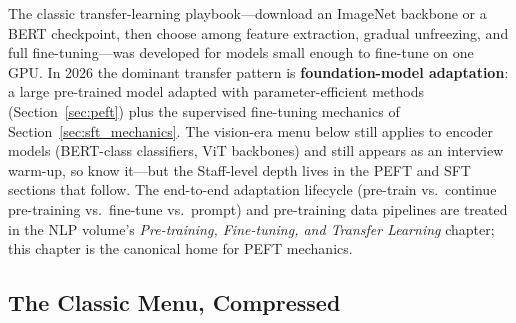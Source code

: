 The classic transfer-learning playbook---download an ImageNet backbone or a BERT checkpoint, then choose among feature extraction, gradual unfreezing, and full fine-tuning---was developed for models small enough to fine-tune on one GPU. In 2026 the dominant transfer pattern is \textbf{foundation-model adaptation}: a large pre-trained model adapted with parameter-efficient methods (Section~\ref{sec:peft}) plus the supervised fine-tuning mechanics of Section~\ref{sec:sft_mechanics}. The vision-era menu below still applies to encoder models (BERT-class classifiers, ViT backbones) and still appears as an interview warm-up, so know it---but the Staff-level depth lives in the PEFT and SFT sections that follow. The end-to-end adaptation lifecycle (pre-train vs.\ continue pre-training vs.\ fine-tune vs.\ prompt) and pre-training data pipelines are treated in the NLP volume's \emph{Pre-training, Fine-tuning, and Transfer Learning} chapter; this chapter is the canonical home for PEFT mechanics.

\subsection{The Classic Menu, Compressed}


